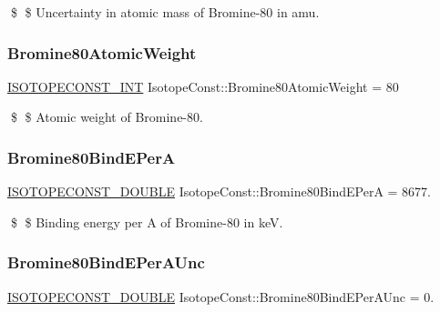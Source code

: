 \$ \$ Uncertainty in atomic mass of Bromine-\/80 in amu. \mbox{\label{group___isotope_const-_bromine-_br80_ga0823618e1a11da476b536db32af9fdab}} 
\subsubsection{\texorpdfstring{Bromine80\+Atomic\+Weight}{Bromine80AtomicWeight}}
{\footnotesize\ttfamily \mbox{\hyperlink{group___isotope_const-_macros_ga5f18360b3e99483a35c32d789e62621c}{I\+S\+O\+T\+O\+P\+E\+C\+O\+N\+S\+T\+\_\+\+I\+NT}} Isotope\+Const\+::\+Bromine80\+Atomic\+Weight = 80}

\$ \$ Atomic weight of Bromine-\/80. \mbox{\label{group___isotope_const-_bromine-_br80_gae03c79f66ef6b6e0eecf832bdd45a360}} 
\subsubsection{\texorpdfstring{Bromine80\+Bind\+E\+PerA}{Bromine80BindEPerA}}
{\footnotesize\ttfamily \mbox{\hyperlink{group___isotope_const-_macros_ga8f45a7272ce02c0b4c65c44636ed719a}{I\+S\+O\+T\+O\+P\+E\+C\+O\+N\+S\+T\+\_\+\+D\+O\+U\+B\+LE}} Isotope\+Const\+::\+Bromine80\+Bind\+E\+PerA = 8677.}

\$ \$ Binding energy per A of Bromine-\/80 in keV. \mbox{\label{group___isotope_const-_bromine-_br80_ga9b6350d75e47fd9f4552301a120c7a9d}} 
\subsubsection{\texorpdfstring{Bromine80\+Bind\+E\+Per\+A\+Unc}{Bromine80BindEPerAUnc}}
{\footnotesize\ttfamily \mbox{\hyperlink{group___isotope_const-_macros_ga8f45a7272ce02c0b4c65c44636ed719a}{I\+S\+O\+T\+O\+P\+E\+C\+O\+N\+S\+T\+\_\+\+D\+O\+U\+B\+LE}} Isotope\+Const\+::\+Bromine80\+Bind\+E\+Per\+A\+Unc = 0.}

